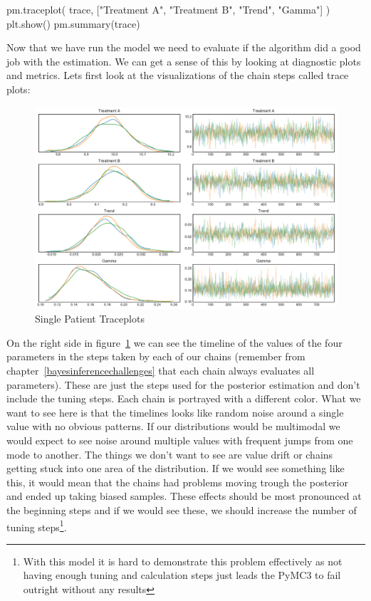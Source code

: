 \documentclass[12pt,a4paper,leqno]{report}
\theoremstyle{plain}
\theoremstyle{definition}
\theoremstyle{remark}
\begin{document}
\bigskip
\begin{pyverbatim}[][fontsize=\footnotesize]
    pm.traceplot(
            trace, ["Treatment A", "Treatment B", "Trend", "Gamma"]
        )
    plt.show()
    pm.summary(trace)
\end{pyverbatim}
\smallskip

Now that we have run the model we need to evaluate if the algorithm did a good job with
the estimation. We can get a sense of this by looking at diagnostic plots and metrics.
Lets first look at the visualizations of the chain steps called trace plots:

\begin{figure}[H]
    \caption{Single Patient Traceplots}\label{traceplots}
    \includegraphics[width=\textwidth,height=\textheight,keepaspectratio]{single_patient_traceplot.pdf}
\end{figure}

On the right side in figure\ \ref{traceplots} we can see the timeline of the values of the
four parameters in the steps taken by each of our
chains (remember from chapter\ \ref{bayesinferencechallenges} that
each chain always evaluates all parameters). These are just the steps used for the
posterior estimation and don't include the
tuning steps. Each chain is portrayed with a different color. What we want to see
here is that the timelines looks like random noise around a single value with no obvious
patterns. If our distributions would be multimodal we would expect to see noise around
multiple values with frequent jumps from one mode to another. The things
we don't want to see are value drift or chains getting stuck into one area of the
distribution. If we would see something like this,
it would mean that the chains had problems moving trough the posterior and ended up
taking biased samples. These effects should be most pronounced at the beginning
steps and if we would see these, we should increase the number of tuning
steps\footnote{With this model it is hard to
demonstrate this problem effectively as not having enough tuning and
calculation steps just leads the PyMC3 to fail outright without any results}.
\end{document}
